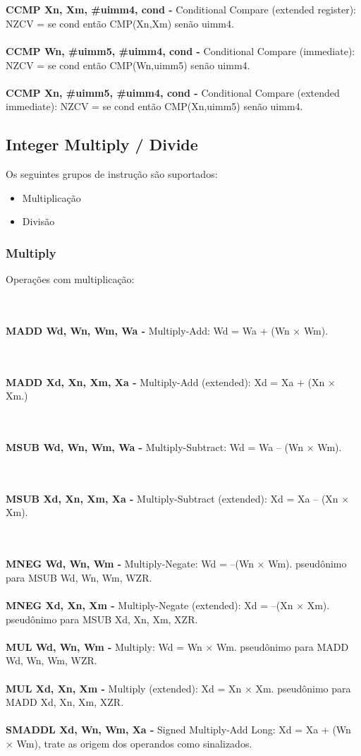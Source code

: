 \documentclass[12pt,a4paper,utf8]{ppgsi}
\begin{document}
\\\\\textbf{CCMP Xn, Xm, \#uimm4, cond -} Conditional Compare (extended register):
NZCV = se cond então CMP(Xn,Xm) senão uimm4. 
\\\\\textbf{CCMP Wn, \#uimm5, \#uimm4, cond -} Conditional Compare (immediate):
NZCV = se cond então CMP(Wn,uimm5) senão uimm4. 
\\\\\textbf{CCMP Xn, \#uimm5, \#uimm4, cond -} Conditional Compare (extended immediate):
NZCV = se cond então CMP(Xn,uimm5) senão uimm4.


\subsection{Integer Multiply / Divide}
Os seguintes grupos de instrução são suportados:
\begin{itemize}
      \item Multiplicação
      \item Divisão
\end{itemize}


\subsubsection{Multiply}
Operações com multiplicação:

\\\\\textbf{MADD Wd, Wn, Wm, Wa -} Multiply-Add: Wd = Wa + (Wn × Wm). 

\\\\\textbf{MADD Xd, Xn, Xm, Xa -} Multiply-Add (extended): Xd = Xa + (Xn × Xm.) 

\\\\\textbf{MSUB Wd, Wn, Wm, Wa -} Multiply-Subtract: Wd = Wa – (Wn × Wm). 

\\\\\textbf{MSUB Xd, Xn, Xm, Xa -} Multiply-Subtract (extended): Xd = Xa – (Xn × Xm). 

\\\\\textbf{MNEG Wd, Wn, Wm -} Multiply-Negate: Wd = –(Wn × Wm).
pseudônimo para MSUB Wd, Wn, Wm, WZR. 
\\\\\textbf{MNEG Xd, Xn, Xm -} Multiply-Negate (extended): Xd = –(Xn × Xm).
pseudônimo para MSUB Xd, Xn, Xm, XZR. 
\\\\\textbf{MUL Wd, Wn, Wm -} Multiply: Wd = Wn × Wm.
pseudônimo para MADD Wd, Wn, Wm, WZR. 
\\\\\textbf{MUL Xd, Xn, Xm -} Multiply (extended): Xd = Xn × Xm.
pseudônimo para MADD Xd, Xn, Xm, XZR. 
\\\\\textbf{SMADDL Xd, Wn, Wm, Xa -} Signed Multiply-Add Long: Xd = Xa + (Wn × Wm), trate as origem dos operandos como sinalizados.
\end{document}
